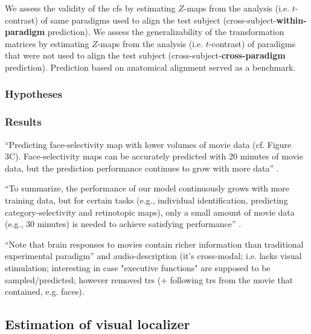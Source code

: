 %
We assess the validity of the \ac{cfs} by estimating $Z$-maps from the analysis
(i.e. $t$-contrast) of same paradigms used to align the test subject
(cross-subject-\textbf{within-paradigm} prediction).
%
We assess the generalizability of the transformation matrices by estimating
$Z$-maps from the analysis (i.e. $t$-contrast) of paradigms that were not used
to align the test subject (cross-subject-\textbf{cross-paradigm} prediction).
%
Prediction based on anatomical alignment served as a benchmark.


\subsubsection{Hypotheses}



\subsubsection{Results}




``Predicting face-selectivity map with lower volumes of movie data (cf. Figure
3C). Face-selectivity maps can be accurately predicted with 20 minutes of movie
data, but the prediction performance continues to grow with more data''
\citep{feilong2022individualized}.

``To summarize, the performance of our model continuously grows with more
training data, but for certain tasks (e.g., individual identification,
predicting category-selectivity and retinotopic maps), only a small amount of
movie data (e.g., 30 minutes) is needed to achieve satisfying performance''
\citep{feilong2022individualized}.

``Note that brain responses to movies contain richer information than
traditional experimental paradigm'' \citep{feilong2022individualized} and
audio-description (it's cross-modal; i.e. lacks visual stimulation; interesting
in case "executive functions" are supposed to be sampled/predicted; however
\citet{haxby2011common} removed \acp{tr} (+ following \acp{tr} from the movie
that contained, e.g. faces).


\subsection{Estimation of visual localizer}

